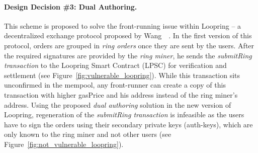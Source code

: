 

\paragraph{Design Decision \#3: Dual Authoring.} This scheme is proposed to solve the front-running issue within Loopring -- a decentralized exchange protocol proposed by Wang~\etal~\cite{wang2018loopring}. In the first version of this protocol, orders are grouped in \emph{ring orders} once they are sent by the users. After the required signatures are provided by the \textit{ring miner}, he sends the \emph{submitRing transaction} to the Loopring Smart Contract (LPSC) for verification and settlement (see Figure~\ref{fig:vulnerable_loopring}). While this transaction sits unconfirmed in the mempool, any front-runner can create a copy of this transaction with higher gasPrice and his address instead of the ring miner's address. Using the proposed \textit{dual authoring} solution in the new version of Loopring, regeneration of the \emph{submitRing transaction} is infeasible as the users have to sign the orders using their secondary private keys (auth-keys), which are only known to the ring miner and not other users (see Figure~\ref{fig:not_vulnerable_loopring}).


